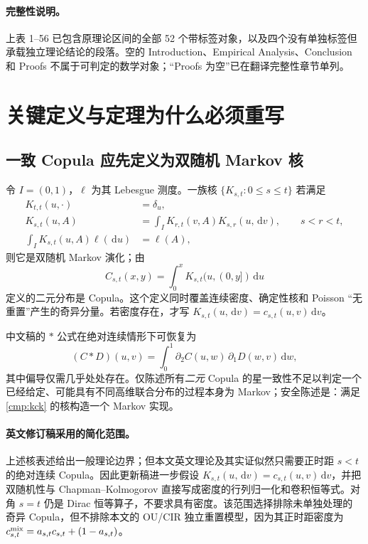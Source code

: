 \documentclass[UTF8,11pt]{ctexart}
\newcommand{\dd}{\,\mathrm d}
\begin{document}
\paragraph{完整性说明。}
上表 1--56 已包含原理论区间的全部 52 个带标签对象，以及四个没有单独标签但承载独立理论结论的段落。空的 Introduction、Empirical Analysis、Conclusion 和 Proofs 不属于可判定的数学对象；“Proofs 为空”已在翻译完整性章节单列。

\section{关键定义与定理为什么必须重写}

\subsection{一致 Copula 应先定义为双随机 Markov 核}

令 $I=(0,1)$，$\ell$ 为其 Lebesgue 测度。一族核 $\{K_{s,t}:0\le s\le t\}$ 若满足
\begin{align}
K_{t,t}(u,\cdot)&=\delta_u,\label{cmp:kid}\\
K_{s,t}(u,A)&=\int_I K_{r,t}(v,A)K_{s,r}(u,\dd v),\qquad s<r<t,\label{cmp:kck}\\
\int_I K_{s,t}(u,A)\ell(\dd u)&=\ell(A),\label{cmp:bistochastic}
\end{align}
则它是双随机 Markov 演化；由
\[
C_{s,t}(x,y)=\int_0^x K_{s,t}(u,(0,y])\dd u
\]
定义的二元分布是 Copula。这个定义同时覆盖连续密度、确定性核和 Poisson “无重置”产生的奇异分量。若密度存在，才写
$K_{s,t}(u,\dd v)=c_{s,t}(u,v)\dd v$。

中文稿的 $*$ 公式在绝对连续情形下可恢复为
\[
(C*D)(u,v)=\int_0^1 \partial_2C(u,w)\,\partial_1D(w,v)\dd w,
\]
其中偏导仅需几乎处处存在。仅陈述所有\emph{二元} Copula 的星一致性不足以判定一个已经给定、可能具有不同高维联合分布的过程本身为 Markov；安全陈述是：满足 \eqref{cmp:kck} 的核构造一个 Markov 实现。

\paragraph{英文修订稿采用的简化范围。}
上述核表述给出一般理论边界；但本文英文理论及其实证似然只需要正时距
$s<t$ 的绝对连续 Copula。因此更新稿进一步假设
$K_{s,t}(u,\dd v)=c_{s,t}(u,v)\dd v$，并把双随机性与
Chapman--Kolmogorov 直接写成密度的行列归一化和卷积恒等式。对角
$s=t$ 仍是 Dirac 恒等算子，不要求具有密度。该范围选择排除未单独处理的
奇异 Copula，但不排除本文的 OU/CIR 独立重置模型，因为其正时距密度为
$c^{\rm mix}_{s,t}=a_{s,t}c_{s,t}+(1-a_{s,t})$。
\end{document}
